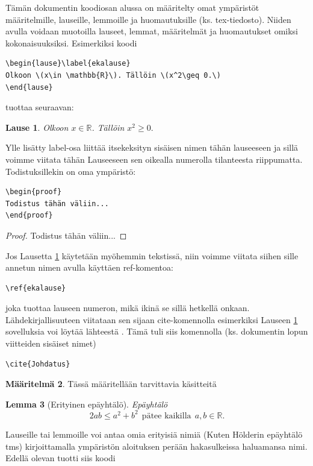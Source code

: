 \documentclass[a4paper,12 pt]{article}
\theoremstyle{plain}
\newtheorem{lause}{Lause}[section]
\newtheorem{lemma}[lause]{Lemma}
\theoremstyle{definition}
\newtheorem{maaritelma}[lause]{M\"a\"aritelm\"a}
\theoremstyle{remark}
\numberwithin{equation}{section}
\numberwithin{figure}{section}
\begin{document}
Tämän dokumentin koodiosan alussa on määritelty omat ympäristöt määritel\-mille, lauseille, lemmoille ja huomautuksille (ks. tex-tiedosto). Niiden avulla voidaan muotoilla lauseet, lemmat, määritelmät ja huomautukset omiksi kokonaisuuksiksi. Esimerkiksi koodi

\begin{verbatim}
\begin{lause}\label{ekalause} 
Olkoon \(x\in \mathbb{R}\). Tällöin \(x^2\geq 0.\)
\end{lause}
\end{verbatim}

tuottaa seuraavan:

\begin{lause}\label{ekalause} 
Olkoon \(x\in \mathbb{R}\). Tällöin \(x^2\geq 0.\)
\end{lause}

\noindent Ylle lisätty label-osa liittää itsekeksityn sisäisen nimen tähän lauseeseen ja sillä voimme viitata tähän Lauseeseen sen oikealla numerolla tilanteesta riippumatta. Todistuksillekin on oma ympäristö:

\begin{verbatim}
\begin{proof}
Todistus tähän väliin...
\end{proof}
\end{verbatim}

\begin{proof}
Todistus tähän väliin...
\end{proof}
Jos Lausetta \ref{ekalause} käytetään myöhemmin tekstissä, niin voimme viitata siihen sille annetun nimen avulla käyttäen ref-komentoa:

\begin{verbatim}
\ref{ekalause}
\end{verbatim}
joka tuottaa lauseen numeron, mikä ikinä se sillä hetkellä onkaan.
Lähde\-kirjallisuuteen viitataan sen sijaan cite-komennolla esimerkiksi Lauseen \ref{ekalause} sovelluksia voi löytää lähteestä \cite{Johdatus}. Tämä tuli siis komennolla (ks. dokumentin lopun viitteiden sisäiset nimet)

\begin{verbatim}
\cite{Johdatus}
\end{verbatim}

\begin{maaritelma}
Tässä määritellään tarvittavia käsitteitä
\end{maaritelma}

\begin{lemma}[Erityinen epäyhtälö]
Epäyhtälö
\[2ab\leq a^2+b^2~~\text{pätee kaikilla}\ \ a,b\in\mathbb{R}.\]
\end{lemma}
Lauseille tai lemmoille voi antaa omia erityisiä nimiä (Kuten Hölderin epäyhtälö tms) kirjoittamalla ympäristön aloituksen perään hakasulkeissa haluamansa nimi. Edellä olevan tuotti siis koodi
\end{document}
